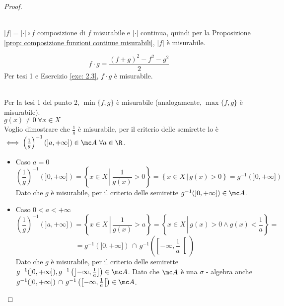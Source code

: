 \begin{proof}
\begin{enumerate}
         \\
        $|f| = |\cdot| \circ f$ composizione di $f$ misurabile e $|\cdot|$ continua, quindi per la Proposizione \ref{prop: composizione funzioni continue misurabili}, $|f|$ è misurabile.

        \[f \cdot g = \frac{(f+g)^2-f^2-g^2}{2} \]
        Per tesi 1 e Esercizio \ref{exc: 2.3}, $f \cdot g$ è misurabile. 

         \\
        Per la tesi 1 del punto 2, $\min \{f,g\}$ è misurabile (analogamente, $\max \{f,g\}$ è misurabile). \\

        $g(x) \neq 0 \ \forall x \in X$
         \\
        Voglio dimostrare che $\frac{1}{g}$ è misurabile, per il criterio delle semirette lo è $\iff \left( \frac{1}{g}\right)^{-1} (]a,+ \infty]) \in \mc A \ \forall a \in \R$.
        \begin{itemize}
            \item Caso $a=0$
            \[ \left( \frac{1}{g}\right)^{-1} (]0,+ \infty]) = \left\{ x \in X \, \left| \, \frac{1}{g(x)} > 0 \right.\right\} = \left\{ x \in X \, \left| \, g(x) > 0\right.\right\} = g^{-1}(]0,+ \infty])\] 
            Dato che $g$ è misurabile, per il criterio delle semirette $g^{-1}(]0,+ \infty]) \in \mc A$.
            
            \item Caso $0<a<+ \infty$
            \[\left( \frac{1}{g}\right)^{-1} (]a,+ \infty]) = \left\{ x \in X \,\left|\, \frac{1}{g(x)} > a\right.\right\} = \left\{ x \in X \, \left| \, g(x) > 0 \land g(x) < \frac{1}{a}\right.\right\} = \]
            \[= g^{-1}(]0,+ \infty]) \, \cap \, g^{-1} \left( \left[- \infty, \frac{1}{a} \right[ \right)\]
            Dato che $g$ è misurabile, per il criterio delle semirette $g^{-1}(]0,+ \infty]), g^{-1} \left( \left]- \infty, \frac{1}{a} \right] \right) \in \mc A$. Dato che $\mc A$ è una $\sigma$ - algebra anche $g^{-1}(]0,+ \infty]) \, \cap \, g^{-1} \left( \left[- \infty, \frac{1}{a} \right[ \right) \in \mc A$.
            

\end{itemize}
\end{enumerate}
\end{proof}
